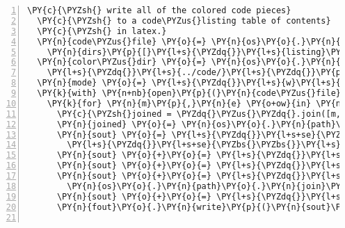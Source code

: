 \begin{Verbatim}[commandchars=\\\{\},numbers=left,numbersep=0.5em]
  \PY{c}{\PYZsh{} write all of the colored code pieces}
  \PY{c}{\PYZsh{} to a code\PYZus{}listing table of contents}
  \PY{c}{\PYZsh{} in latex.}
  \PY{n}{code\PYZus{}file} \PY{o}{=} \PY{n}{os}\PY{o}{.}\PY{n}{path}\PY{o}{.}\PY{n}{join}\PY{p}{(}
    \PY{n}{dirs}\PY{p}{[}\PY{l+s}{\PYZdq{}}\PY{l+s}{listing}\PY{l+s}{\PYZdq{}}\PY{p}{]}\PY{p}{,} \PY{l+s}{\PYZdq{}}\PY{l+s}{code.tex}\PY{l+s}{\PYZdq{}}\PY{p}{)}
  \PY{n}{color\PYZus{}dir} \PY{o}{=} \PY{n}{os}\PY{o}{.}\PY{n}{path}\PY{o}{.}\PY{n}{join}\PY{p}{(} 
    \PY{l+s}{\PYZdq{}}\PY{l+s}{../code/}\PY{l+s}{\PYZdq{}}\PY{p}{,} \PY{n}{dirs}\PY{p}{[}\PY{l+s}{\PYZdq{}}\PY{l+s}{color}\PY{l+s}{\PYZdq{}}\PY{p}{]} \PY{p}{)}
  \PY{n}{mode} \PY{o}{=} \PY{l+s}{\PYZdq{}}\PY{l+s}{w}\PY{l+s}{\PYZdq{}} \PY{k}{if} \PY{n}{delete} \PY{k}{else} \PY{l+s}{\PYZdq{}}\PY{l+s}{a}\PY{l+s}{\PYZdq{}}
  \PY{k}{with} \PY{n+nb}{open}\PY{p}{(}\PY{n}{code\PYZus{}file}\PY{p}{,} \PY{n}{mode}\PY{p}{)} \PY{k}{as} \PY{n}{fout}\PY{p}{:}
    \PY{k}{for} \PY{n}{m}\PY{p}{,}\PY{n}{e} \PY{o+ow}{in} \PY{n+nb}{sorted}\PY{p}{(}\PY{n}{matched\PYZus{}files}\PY{p}{)}\PY{p}{:}
      \PY{c}{\PYZsh{}joined = \PYZdq{}\PYZus{}\PYZdq{}.join([m, e])}
      \PY{n}{joined} \PY{o}{=} \PY{n}{os}\PY{o}{.}\PY{n}{path}\PY{o}{.}\PY{n}{join}\PY{p}{(}\PY{n}{e}\PY{p}{,}\PY{n}{m}\PY{p}{)}
      \PY{n}{sout} \PY{o}{=} \PY{l+s}{\PYZdq{}}\PY{l+s+se}{\PYZbs{}\PYZbs{}}\PY{l+s}{code\PYZob{}\PYZob{}\PYZob{}\PYZcb{}.\PYZob{}\PYZcb{}\PYZcb{}\PYZcb{}}\PY{l+s+se}{\PYZbs{}n}\PY{l+s}{\PYZdq{}}\PY{o}{.}\PY{n}{format}\PY{p}{(}
        \PY{l+s}{\PYZdq{}}\PY{l+s+se}{\PYZbs{}\PYZbs{}}\PY{l+s}{\PYZus{}}\PY{l+s}{\PYZdq{}}\PY{o}{.}\PY{n}{join}\PY{p}{(} \PY{n}{m}\PY{o}{.}\PY{n}{split}\PY{p}{(}\PY{l+s}{\PYZdq{}}\PY{l+s}{\PYZus{}}\PY{l+s}{\PYZdq{}}\PY{p}{)}\PY{p}{)}\PY{p}{,} \PY{n}{e}\PY{p}{)}
      \PY{n}{sout} \PY{o}{+}\PY{o}{=} \PY{l+s}{\PYZdq{}}\PY{l+s+se}{\PYZbs{}\PYZbs{}}\PY{l+s}{label\PYZob{}\PYZob{}code/\PYZob{}\PYZcb{}\PYZcb{}\PYZcb{}}\PY{l+s+se}{\PYZbs{}n}\PY{l+s}{\PYZdq{}}\PY{o}{.}\PY{n}{format}\PY{p}{(}\PY{n}{joined}\PY{p}{)}
      \PY{n}{sout} \PY{o}{+}\PY{o}{=} \PY{l+s}{\PYZdq{}}\PY{l+s+se}{\PYZbs{}\PYZbs{}}\PY{l+s}{begin\PYZob{}footnotesize\PYZcb{}}\PY{l+s}{\PYZdq{}}
      \PY{n}{sout} \PY{o}{+}\PY{o}{=} \PY{l+s}{\PYZdq{}}\PY{l+s+se}{\PYZbs{}\PYZbs{}}\PY{l+s}{input\PYZob{}\PYZob{}\PYZob{}\PYZcb{}.tex\PYZcb{}\PYZcb{}}\PY{l+s}{\PYZdq{}}\PY{o}{.}\PY{n}{format}\PY{p}{(}
        \PY{n}{os}\PY{o}{.}\PY{n}{path}\PY{o}{.}\PY{n}{join}\PY{p}{(}\PY{n}{color\PYZus{}dir}\PY{p}{,} \PY{n}{joined}\PY{p}{)}\PY{p}{)}
      \PY{n}{sout} \PY{o}{+}\PY{o}{=} \PY{l+s}{\PYZdq{}}\PY{l+s+se}{\PYZbs{}\PYZbs{}}\PY{l+s}{end\PYZob{}footnotesize\PYZcb{}}\PY{l+s+se}{\PYZbs{}n}\PY{l+s+se}{\PYZbs{}n}\PY{l+s}{\PYZdq{}}
      \PY{n}{fout}\PY{o}{.}\PY{n}{write}\PY{p}{(}\PY{n}{sout}\PY{p}{)}


\end{Verbatim}
